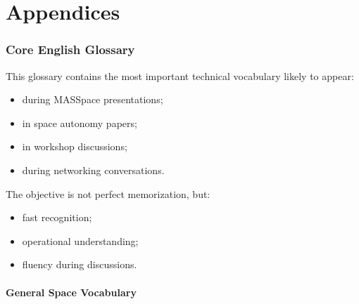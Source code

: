 \documentclass[10pt,a4paper,twocolumn]{article}
\begin{document}

\appendix

\part{Appendices}


\section{Core English Glossary}

This glossary contains the most important technical vocabulary likely to appear:
\begin{itemize}
    \item during MASSpace presentations;
    \item in space autonomy papers;
    \item in workshop discussions;
    \item during networking conversations.
\end{itemize}

The objective is not perfect memorization, but:
\begin{itemize}
    \item fast recognition;
    \item operational understanding;
    \item fluency during discussions.
\end{itemize}


\subsection{General Space Vocabulary}
\end{document}
